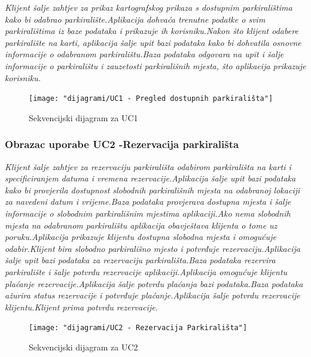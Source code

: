 {\textit{Klijent šalje zahtjev za prikaz kartografskog prikaza s dostupnim parkiralištima kako bi odabrao parkiralište.Aplikacija dohvaća trenutne podatke o svim parkiralištima iz baze podataka i prikazuje ih korisniku.Nakon što klijent odabere parkiralište na karti, aplikacija šalje upit bazi podataka kako bi dohvatila osnovne informacije o odabranom parkiralištu.Baza podataka odgovara na upit i šalje informacije o parkiralištu i zauzetosti parkirališnih mjesta, što aplikacija prikazuje korisniku.}

\begin{figure}[!htb]
	\centering
	\texttt{[image: "dijagrami/UC1 - Pregled dostupnih parkirališta"]}
	\caption{Sekvencijski dijagram za UC1}
	\label{fig:uc1---pregled-dostupnih-parkiralista}
\end{figure}


\subsubsection{Obrazac uporabe UC2 -Rezervacija parkirališta}

\textit{Klijent šalje zahtjev za rezervaciju parkirališta odabirom parkirališta na karti i specificiranjem datuma i vremena rezervacije.Aplikacija šalje upit bazi podataka kako bi provjerila dostupnost slobodnih parkirališnih mjesta na odabranoj lokaciji za navedeni datum i vrijeme.Baza podataka provjerava dostupna mjesta i šalje informacije o slobodnim parkirališnim mjestima aplikaciji.Ako nema slobodnih mjesta na odabranom parkiralištu aplikacija obavještava klijenta o tome uz poruku.Aplikacija prikazuje klijentu dostupna slobodna mjesta i omogućuje odabir.Klijent bira slobodno parkirališno mjesto i potvrđuje rezervaciju.Aplikacija šalje upit bazi podataka za rezervaciju parkirališta.Baza podataka rezervira parkiralište i šalje potvrdu rezervacije aplikaciji.Aplikacija omogućuje klijentu plaćanje rezervacije.Aplikacija šalje potvrdu plaćanja bazi podataka.Baza podataka ažurira status rezervacije i potvrđuje plaćanje.Aplikacija šalje potvrdu rezervacije klijentu.Klijent prima potvrdu rezervacije.}


\begin{figure}[!htb]
	\centering
	\texttt{[image: "dijagrami/UC2 - Rezervacija Parkirališta"]}
	\caption{Sekvencijski dijagram za UC2}
	\label{fig:uc2---rezervacija-parkiralista}
\end{figure}

\newpage

}
